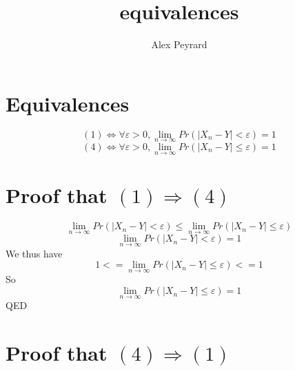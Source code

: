 \documentclass[10pt]{article}
\author{Alex Peyrard}
\title{equivalences}
\begin{document}
\maketitle

\section{Equivalences}
\[(1) \Leftrightarrow \forall\varepsilon>0, \lim_{n \to \infty} Pr(|X_{n}-Y|<\varepsilon)=1\]
\[(4) \Leftrightarrow \forall\varepsilon>0, \lim_{n \to \infty} Pr(|X_{n}-Y|\leq\varepsilon)=1\]
\section{Proof that $(1) \Rightarrow (4)$}
\[\lim_{n \to \infty} Pr(|X_{n}-Y|<\varepsilon) \leq \lim_{n \to \infty} Pr(|X_{n}-Y|\leq\varepsilon)\]
\[\lim_{n \to \infty} Pr(|X_{n}-Y|<\varepsilon) = 1\]
We thus have
\[1 <= \lim_{n \to \infty} Pr(|X_{n}-Y|\leq\varepsilon) <= 1\]
So \[ \lim_{n \to \infty} Pr(|X_{n}-Y|\leq\varepsilon) = 1 \]
QED
\section{Proof that $(4) \Rightarrow (1)$}
\end{document}
